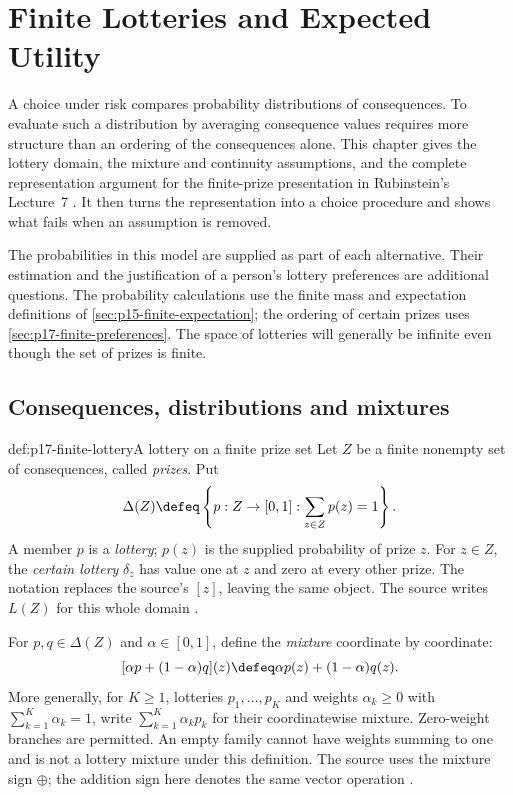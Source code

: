 \chapter{Finite Lotteries and Expected Utility}
\label{sec:p17-finite-expected-utility}

A choice under risk compares probability distributions of consequences.
To evaluate such a distribution by averaging consequence values requires
more structure than an ordering of the consequences alone. This chapter
gives the lottery domain, the mixture and continuity assumptions, and the
complete representation argument for the finite-prize presentation in
Rubinstein's Lecture~7 \cite[2015 revision, pp.~94--100]{Rubinstein2015LectureNotes}.
It then turns the representation into a choice procedure and shows what
fails when an assumption is removed.

The probabilities in this model are supplied as part of each alternative.
Their estimation and the justification of a person's lottery preferences
are additional questions. The probability calculations use the finite
mass and expectation definitions of \cref{sec:p15-finite-expectation};
the ordering of certain prizes uses \cref{sec:p17-finite-preferences}.
The space of lotteries will generally be infinite even though the set of
prizes is finite.

\section{Consequences, distributions and mixtures}
\label{sec:p17-lottery-domain}

\begin{hbdefinition}{def:p17-finite-lottery}{A lottery on a finite prize set}
Let \(Z\) be a finite nonempty set of consequences, called \emph{prizes}.
Put
\[
 \Delta(Z)\defeq\left\{p:Z\to[0,1]:\sum_{z\in Z}p(z)=1\right\}.
\]
A member \(p\) is a \emph{lottery}; \(p(z)\) is the supplied probability
of prize \(z\). For \(z\in Z\), the \emph{certain lottery} \(\delta_z\)
has value one at \(z\) and zero at every other prize. The notation replaces
the source's \([z]\), leaving the same object. The source writes
\(L(Z)\) for this whole domain \cite[p.~94]{Rubinstein2015LectureNotes}.

For \(p,q\in\Delta(Z)\) and \(\alpha\in[0,1]\), define the
\emph{mixture} coordinate by coordinate:
\[
 [\alpha p+(1-\alpha)q](z)\defeq\alpha p(z)+(1-\alpha)q(z).
\]
More generally, for \(K\geq1\), lotteries \(p_1,\ldots,p_K\) and
weights \(\alpha_k\geq0\) with \(\sum_{k=1}^K\alpha_k=1\), write
\(\sum_{k=1}^K\alpha_kp_k\) for their coordinatewise mixture.
Zero-weight branches are permitted. An empty family cannot have weights
summing to one and is not a lottery mixture under this definition.
The source uses the mixture sign \(\oplus\); the addition sign here
denotes the same vector operation \cite[pp.~96--97]{Rubinstein2015LectureNotes}.
\end{hbdefinition}

